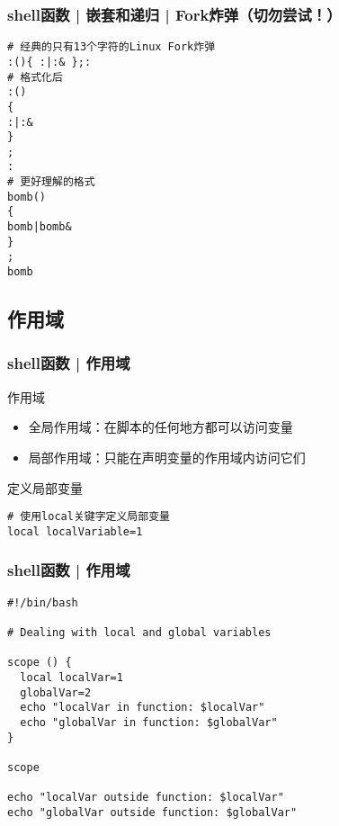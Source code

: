 \begin{frame}[fragile]
  \frametitle{shell函数 | 嵌套和递归 | Fork炸弹（\alert{切勿尝试！}）}
\begin{lstlisting}
# 经典的只有13个字符的Linux Fork炸弹
:(){ :|:& };:
# 格式化后
:()
{
:|:&
}
;
:
# 更好理解的格式
bomb()
{
bomb|bomb&
}
;
bomb
\end{lstlisting}
\end{frame}

\subsection{作用域}
\begin{frame}[fragile]
  \frametitle{shell函数 | \alert{作用域}}
  \begin{block}{作用域}
    \begin{itemize}
      \item 全局作用域：在脚本的任何地方都可以访问变量
      \item 局部作用域：只能在声明变量的作用域内访问它们
    \end{itemize}
  \end{block}
  \begin{block}{定义局部变量}
\begin{lstlisting}
# 使用local关键字定义局部变量
local localVariable=1
\end{lstlisting}
  \end{block}
\end{frame}

\begin{frame}[fragile]
  \frametitle{shell函数 | 作用域}
\begin{lstlisting}
#!/bin/bash

# Dealing with local and global variables

scope () {
  local localVar=1
  globalVar=2
  echo "localVar in function: $localVar"
  echo "globalVar in function: $globalVar"
}

scope

echo "localVar outside function: $localVar"
echo "globalVar outside function: $globalVar"
\end{lstlisting}
\end{frame}


